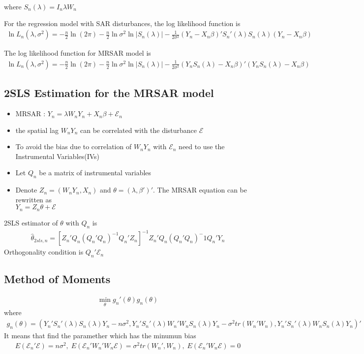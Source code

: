 \documentclass[11pt]{article}
\begin{document}
where $S_n(\lambda) = I_n \lambda W_n$

For the regression model with SAR disturbances, the log likelihood function is
\begin{align}
\ln L_n(\lambda,\sigma^2) = -\frac{n}{2} \ln(2\pi) - \frac{n}{2} \ln \sigma^2 \ln|S_n(\lambda)| - \frac{1}{2\sigma^2} (Y_n-X_n\beta)'S_n'(\lambda)S_n(\lambda)(Y_n-X_n\beta)\nonumber
\end{align}

The log likelihood function for MRSAR model is
\begin{align}
\ln L_n(\lambda,\sigma^2) = -\frac{n}{2} \ln(2\pi) - \frac{n}{2} \ln \sigma^2 \ln|S_n(\lambda)| - \frac{1}{2\sigma^2} (Y_n S_n(\lambda)- X_n \beta)'(Y_n S_n(\lambda)- X_n \beta)\nonumber
\end{align}
\subsection{2SLS Estimation for the MRSAR model}

\begin{itemize}
	\item MRSAR : $Y_n =\lambda W_n Y_n + X_n \beta + \mathcal{E}_n$
	\item the spatial lag $W_n Y_n$ can be correlated with the disturbance $\mathcal{E}$
	\item To avoid the bias due to correlation of $W_n Y_n$ with $\mathcal{E}_n$ need to use the Instrumental Variables(IVs)
	\item Let $Q_n$ be a matrix of instrumental variables
	\item Denote $Z_n = (W_n Y_n, X_n)$ and $\theta = (\lambda, \beta')'$. The MRSAR equation can be rewritten as \\ $Y_n = Z_n\theta + \mathcal{E}$
\end{itemize}

2SLS estimator of $\theta$ with $Q_n$ is
\begin{align}
\hat{\theta}_{2sls,n} = [Z_n' Q_n (Q_n' Q_n)^{-1} Q_n' Z_n]^{-1}Z_n' Q_n(Q_n' Q_n)^-1 Q_n' Y_n \nonumber
\end{align}
Orthogonality condition is $Q_n' \mathcal{E}_n$


\subsection{Method of Moments}
\begin{align}
\min_{\theta} g_n'(\theta) g_n(\theta) \nonumber 
\end{align}
where
\begin{align}
g_n(\theta) = (Y_n'S_n'(\lambda) S_n(\lambda) Y_n- n\sigma^2,Y_n'S_n'(\lambda)W_n' W_n S_n(\lambda) Y_n - \sigma^2 tr(W_n' W_n),Y_n'S_n'(\lambda) W_n S_n(\lambda) Y_n)' \nonumber
\end{align}
It means that find the paramether which has the minumun bias 
\begin{align}
E(\mathcal{E}_n' \mathcal{E}) = n \sigma^2, \; E(\mathcal{E}_n' W_n' W_n \mathcal{E}) = \sigma^2 tr(W_n', W_n), \; E(\mathcal{E}_n' W_n \mathcal{E}) = 0 \nonumber
\end{align}
\end{document}
